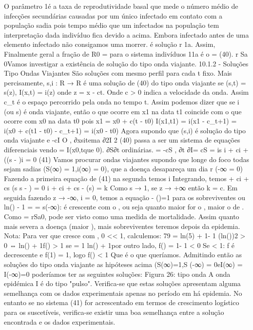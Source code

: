 {{{{{{{{{{{{{{{{{{{{{{{{O parâmetro \lambda 1é a taxa de reprodutividade basal que mede o número médio de infecções secundárias causadas por um único infectado em contato com a população sadia pois tempo médio que um infectados na população tem interpretação dada indivíduo fica devido a acima. Embora infectado antes de uma elemento infectado não consigamos uma morrer. é solução r 1a. Assim, Finalmente geral a fração de R0 = para o sistema indivíduos 1\lambda 1a é o = (40). r Sa 0Vamos investigar a existência de solução do tipo onda viajante. 
10.1.2 - Soluções Tipo Ondas Viajantes 
São soluções com mesmo perfil para cada t fixo. Mais percisamente, s,i : R → R é uma solução de (40) do tipo onda viajante se (s,t) = s(z), I(x,t) = i(z) onde z = x - ct. Onde c > 0 indica a velocidade da onda. Assim c_{t} é o espaço percorrido pela onda no tempo t. 
Assim podemos dizer que se i (ou s) é onda viajante, então o que ocorre em x1 na data t1 coincide com o que ocorre com x0 na data t0 pois x1 = x0 + c(t - t0) I(x1,t1) = i(x1 - c_{t+1}) = i(x0 + c(t1 - t0) - c_{t+1}) = i(x0 - t0) Agora supondo que (s,i) é solução do tipo onda viajante e -cI O , ∂xsitema ∂2I 
2 
(40) passa a ser um sistema de equações diferenciais vendo = I(x0,tque 0). 
∂S∂t ordinárias. 
= -cS , ∂t ∂I= 
{ cS = is 
i + ci + ((s - \lambda)i = 0 (41) 
Vamos procurar ondas viajantes supondo que longe do foco todas sejam sadias (S(∞) = 1,i(∞) = 0), que a doença desapareça um dia r (-∞ = 0) 
Fazendo a primeira equação de (41) na segunda temos i Integrando, temos 
+ ci + cs (s s - \lambda) 
= 0 
i + ci + cs - \lambdacln(s) = k Como s → 1, se z → +∞ então k = c. Em seguida fazendo z → -∞, i = 0, temos a equação \sigma  - \lambdaln(\sigma )=1 para os sobreviventes ou \sigma \sigma  ln(\sigma ) - 1 
\sigma  = = \lambda 
s(-∞): 
\lambda é crescente com o \sigma , ou seja quanto maior for o \lambda, maior o de \sigma . Como \lambda = rSa0, \lambda pode ser visto como uma medida de mortalidade. Assim quanto mais severa a doença (maior \lambda), mais sobreviventes teremos depois da epidemia. 
Nota: Para ver que \lambda cresce com \sigma , 0 <\sigma < 1, calculemos: 
79 
\lambda = ln(5) + 1\sigma  - 1 
(ln(\sigma ))2 > 0 ⇔ ln(\sigma ) + 1\sigma  f(\sigma ) > 1 se \sigma  = 1 \Rightarrow  ln(\sigma ) + 1\sigma  por outro lado, f(\sigma ) = 1\sigma  - 1 < 0 
Se \sigma  < 1: f é decrescente e f(1) = 1, logo f(\sigma ) < 1 
Que é o que queríamos. Admitindo então as soluções do tipo onda viajante as hipóteses acima (S(∞)=1,S (-∞) = 0eI(∞) = I(-∞)=0 poderíamos ter as seguintes soluções: 
Figura 26: tipo onda 
A onda epidémica I é do tipo "pulso". Verifica-se que estas soluções apresentam alguma semelhança com os dados experimentais apenas no período em há epidemia. No entanto se no sistema (41) for acrescentado em termos de crescimento logístico para os suscetíveis, verifica-se existir uma boa semelhança entre a solução encontrada e os dados experimentais. 
}}}}}}}}}}}}}}}}}}}}}}}}}

